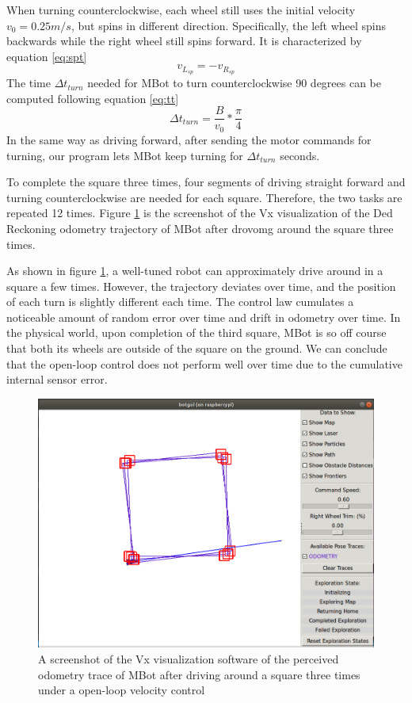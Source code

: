 \documentclass[conference]{IEEEtran}
\begin{document}
When turning counterclockwise, each wheel still uses the initial velocity $v_0 = 0.25 m/s$, but spins in different direction. Specifically, the left wheel spins backwards while the right wheel still spins forward. It is characterized by equation \ref{eq:spt}
\begin{equation} \label{eq:spt}
v_{L_{sp}} = -v_{R_{sp}}
\end{equation}
The time $\Delta t_{turn}$ needed for MBot to turn counterclockwise 90 degrees can be computed following equation \ref{eq:tt}
\begin{equation} \label{eq:tt}
\Delta t_{turn} = \frac{B}{v_0} * \frac{\pi}{4}
\end{equation}
In the same way as driving forward, after sending the motor commands for turning, our program lets MBot keep turning for $\Delta t_{turn}$ seconds.

To complete the square three times, four segments of driving straight forward and turning counterclockwise are needed for each square. Therefore, the two tasks are repeated 12 times. Figure \ref{fig:task4} is the screenshot of the Vx visualization of the Ded Reckoning odometry trajectory of MBot after drovomg around the square three times. 

As shown in figure \ref{fig:task4}, a well-tuned robot can approximately drive around in  a square a few times. However, the trajectory deviates over time, and the position of each turn is slightly different each time. The control law cumulates a noticeable amount of random error over time and drift in odometry over time. In the physical world, upon completion of the third square, MBot is so off course that both its wheels are outside of the square on the ground. We can conclude that the open-loop control does not perform well over time due to the cumulative internal sensor error.

\begin{figure}
	\includegraphics[width=\linewidth]{task4.png}
	\caption{A screenshot of the Vx visualization software of the perceived odometry trace of MBot after driving around a square three times under a open-loop velocity control}
	\label{fig:task4}
\end{figure}
\end{document}
